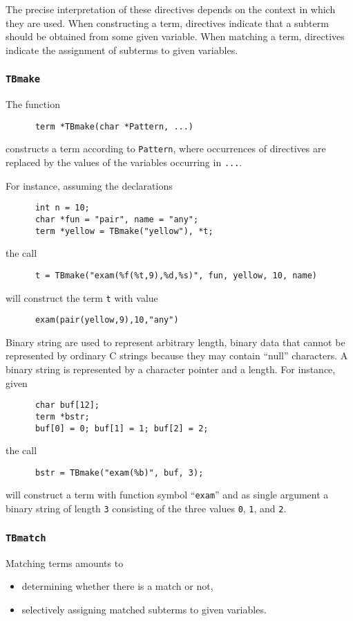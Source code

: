 The precise interpretation of these directives depends on the context
in which they are used.  When constructing a term, directives indicate
that a subterm should be obtained from some given variable.  When
matching a term, directives indicate the assignment of subterms to
given variables.

\subsubsection{\label{TBmake}{\tt TBmake}}
The function
\begin{verbatim}
      term *TBmake(char *Pattern, ...)
\end{verbatim}
constructs a term according to {\tt Pattern}, where occurrences of
directives are replaced by the values of the variables
occurring in {\tt ...}.

For instance, assuming the declarations
\begin{verbatim}
      int n = 10;
      char *fun = "pair", name = "any";
      term *yellow = TBmake("yellow"), *t;
\end{verbatim}
the call
\begin{verbatim}
      t = TBmake("exam(%f(%t,9),%d,%s)", fun, yellow, 10, name)
\end{verbatim}
will construct the term {\tt t} with value
\begin{verbatim}
      exam(pair(yellow,9),10,"any")
\end{verbatim}

Binary string are used to represent arbitrary length, binary data
that cannot be represented by ordinary C strings because they may
contain ``null'' characters. A binary string is represented by
a character pointer and a length. For instance, given
\begin{verbatim}
      char buf[12];
      term *bstr;
      buf[0] = 0; buf[1] = 1; buf[2] = 2;
\end{verbatim}
the call
\begin{verbatim}
      bstr = TBmake("exam(%b)", buf, 3);
\end{verbatim}
will construct a term with function symbol ``{\tt exam}'' and as single
argument a binary string of length {\tt 3} consisting of the three
values {\tt 0}, {\tt 1}, and {\tt 2}.

\subsubsection{\label{TBmatch}{\tt TBmatch}}
Matching terms amounts to
\begin{itemize}
\item determining whether there is a match or not,
\item selectively assigning matched subterms to given variables.
\end{itemize}

